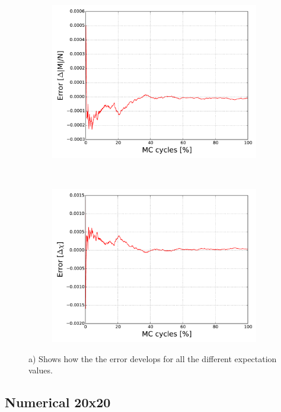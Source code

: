 \begin{figure}[H]
\begin{subfigure}{0.5\textwidth}
		\includegraphics[width=\linewidth]{result/bilder/2x2/mabserror22}
		\caption{}
	\end{subfigure}%
	~ 
	\begin{subfigure}{0.5\textwidth}
		\centering
		\includegraphics[width=\linewidth]{result/bilder/2x2/chierror22}
		\caption{}
	\end{subfigure}
	\caption{a) Shows how the the error develops for all the different expectation values.}
	\label{22error}
\end{figure}








\subsection{Numerical 20x20}

